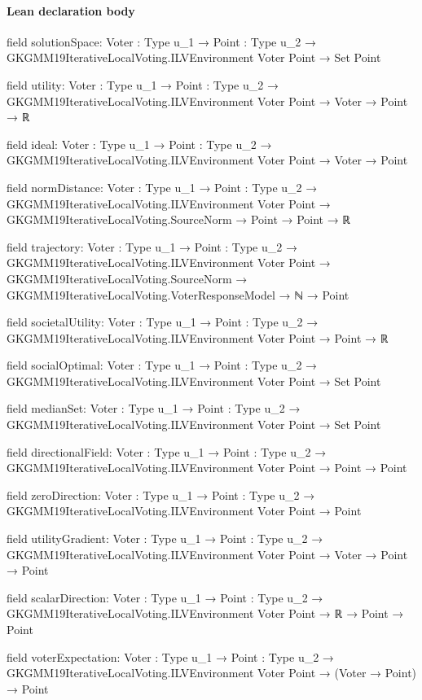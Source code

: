 \documentclass[10pt]{article}
\begin{document}
\paragraph{Lean declaration body}
\begin{ReviewVerbatim}
field solutionSpace:
{Voter : Type u_1} → {Point : Type u_2} → GKGMM19IterativeLocalVoting.ILVEnvironment Voter Point → Set Point

field utility:
{Voter : Type u_1} → {Point : Type u_2} → GKGMM19IterativeLocalVoting.ILVEnvironment Voter Point → Voter → Point → ℝ

field ideal:
{Voter : Type u_1} → {Point : Type u_2} → GKGMM19IterativeLocalVoting.ILVEnvironment Voter Point → Voter → Point

field normDistance:
{Voter : Type u_1} →
  {Point : Type u_2} →
    GKGMM19IterativeLocalVoting.ILVEnvironment Voter Point → GKGMM19IterativeLocalVoting.SourceNorm → Point → Point → ℝ

field trajectory:
{Voter : Type u_1} →
  {Point : Type u_2} →
    GKGMM19IterativeLocalVoting.ILVEnvironment Voter Point →
      GKGMM19IterativeLocalVoting.SourceNorm → GKGMM19IterativeLocalVoting.VoterResponseModel → ℕ → Point

field societalUtility:
{Voter : Type u_1} → {Point : Type u_2} → GKGMM19IterativeLocalVoting.ILVEnvironment Voter Point → Point → ℝ

field socialOptimal:
{Voter : Type u_1} → {Point : Type u_2} → GKGMM19IterativeLocalVoting.ILVEnvironment Voter Point → Set Point

field medianSet:
{Voter : Type u_1} → {Point : Type u_2} → GKGMM19IterativeLocalVoting.ILVEnvironment Voter Point → Set Point

field directionalField:
{Voter : Type u_1} → {Point : Type u_2} → GKGMM19IterativeLocalVoting.ILVEnvironment Voter Point → Point → Point

field zeroDirection:
{Voter : Type u_1} → {Point : Type u_2} → GKGMM19IterativeLocalVoting.ILVEnvironment Voter Point → Point

field utilityGradient:
{Voter : Type u_1} → {Point : Type u_2} → GKGMM19IterativeLocalVoting.ILVEnvironment Voter Point → Voter → Point → Point

field scalarDirection:
{Voter : Type u_1} → {Point : Type u_2} → GKGMM19IterativeLocalVoting.ILVEnvironment Voter Point → ℝ → Point → Point

field voterExpectation:
{Voter : Type u_1} →
  {Point : Type u_2} → GKGMM19IterativeLocalVoting.ILVEnvironment Voter Point → (Voter → Point) → Point


\end{ReviewVerbatim}
\end{document}
